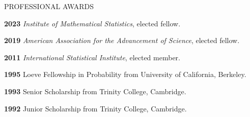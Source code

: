 \begin{mylist}{PROFESSIONAL AWARDS}

\item{\bf 2023}  {\it Institute of Mathematical Statistics}, elected fellow.

\item{\bf 2019}  {\it American Association for the Advancement of Science}, elected fellow. 

\item{\bf 2011} {\it International Statistical Institute}, elected member.
  
\item{\bf 1995 } Loeve Fellowship in Probability from University of California, Berkeley.

\item{\bf 1993 } Senior Scholarship from Trinity College, Cambridge.

\item{\bf 1992 } Junior Scholarship from Trinity College, Cambridge.

\end{mylist}


\lsp

